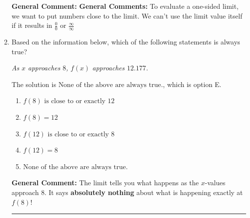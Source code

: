 \documentclass{extbook}[14pt]
\newcommand{\litem}[1]{\item #1

\rule{\textwidth}{0.4pt}}
\begin{document}
\begin{enumerate}
{\textbf{General Comment:} \textbf{General Comments:} To evaluate a one-sided limit, we want to put numbers close to the limit. We can't use the limit value itself if it results in $\frac{0}{0}$ or $\frac{\infty}{\infty}$
}
\litem{
Based on the information below, which of the following statements is always true?

\begin{center}
    \textit{ As $x$ approaches $8$, $f(x)$ approaches $12.177$. }
\end{center}
The solution is \( \text{None of the above are always true.} \), which is option E.\begin{enumerate}[label=\Alph*.]
\item \( f(8) \text{ is close to or exactly } 12 \)


\item \( f(8) = 12 \)


\item \( f(12) \text{ is close to or exactly } 8 \)


\item \( f(12) = 8 \)


\item \( \text{None of the above are always true.} \)


\end{enumerate}

\textbf{General Comment:} The limit tells you what happens as the $x$-values approach $8$. It says \textbf{absolutely nothing} about what is happening exactly at $f(8)$!
}
\end{enumerate}
\end{document}

